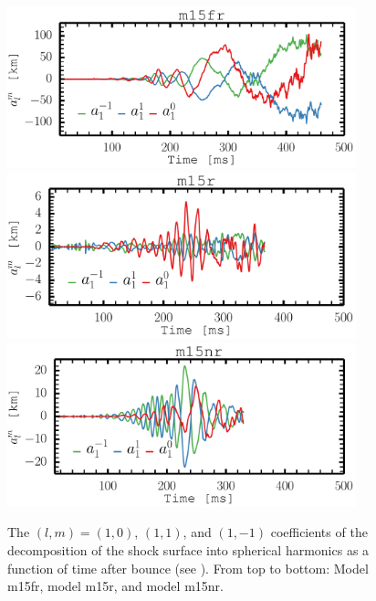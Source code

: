 \begin{figure}[ht]         
\centering                            
\includegraphics[width=0.9\textwidth]{./images/paper2/sasi_fr.pdf}
\includegraphics[width=0.9\textwidth]{./images/paper2/sasi_r.pdf}
\includegraphics[width=0.9\textwidth]{./images/paper2/sasi_nr.pdf}
\caption{The $(l,m) = (1,0)$, $(1,1)$, and $(1,-1)$ coefficients of the decomposition of the shock surface into spherical harmonics
as a function of time after bounce (see ). From top to bottom: Model m15fr, model m15r, and model m15nr. \label{figp2:sasi}}
\end{figure}

